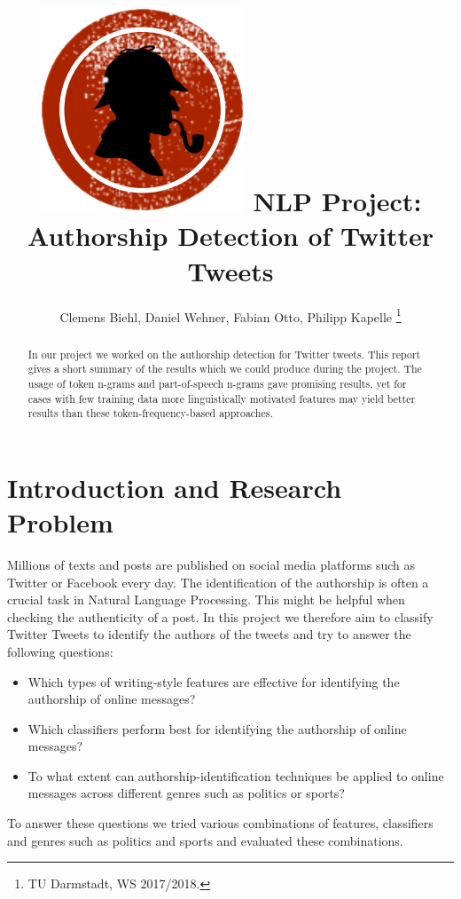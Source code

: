 \documentclass[journal, a4paper, 12pt]{IEEEtran}
\begin{document}
\title{\includegraphics[scale=0.1]{logo.png} NLP Project: Authorship Detection of Twitter Tweets}
\author{Clemens Biehl, Daniel Wehner, Fabian Otto, Philipp Kapelle
\thanks{TU Darmstadt, WS 2017/2018.}}
\maketitle

\begin{abstract}
In our project we worked on the authorship detection for Twitter tweets. This report gives a short summary of the results which we could produce during the project. The usage of token n-grams and part-of-speech n-grams gave promising results, yet for cases with few training data more linguistically motivated features may yield better results than these token-frequency-based approaches.
\end{abstract}
	
\section{Introduction and Research Problem}
Millions of texts and posts are published on social media platforms such as Twitter or Facebook every day. The identification of the authorship is often a crucial task in Natural Language Processing. This might be helpful when checking the authenticity of a post. In this project we therefore aim to classify Twitter Tweets to identify the authors of the tweets and try to answer the following questions:
\vspace{-2mm}
\begin{itemize}
\item Which types of writing-style features are effective for identifying the authorship of online messages?
\item Which classifiers perform best for identifying the authorship of online messages?
\item To what extent can authorship-identification techniques be applied to online messages across different genres such as politics or sports?
\end{itemize}
\vspace{-2mm}
To answer these questions we tried various combinations of features, classifiers and genres such as politics and sports and evaluated these combinations.
\end{document}
